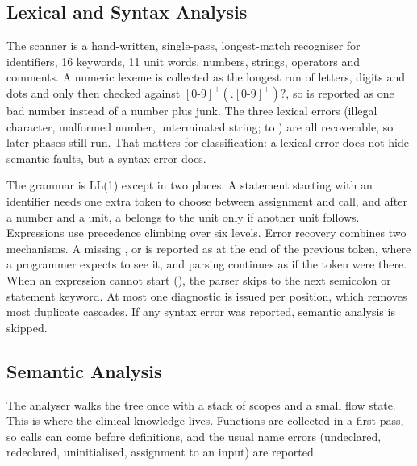 \subsection{Lexical and Syntax Analysis}

The scanner is a hand-written, single-pass, longest-match recogniser for identifiers, 16 keywords, 11 unit words,
numbers, strings, operators and \code{//} comments. A numeric lexeme is collected as the longest run of letters, digits
and dots and only then checked against $[0\text{-}9]^+(.[0\text{-}9]^+)?$, so  is reported as one bad
number instead of a number plus junk. The three lexical errors (illegal character, malformed number, unterminated
string;  to ) are all recoverable, so later phases still run. That matters for
classification: a lexical error does not hide semantic faults, but a syntax error does.

The grammar is LL(1) except in two places. A statement starting with an identifier needs one extra token to choose
between assignment and call, and after a number and a unit, a \code{/} belongs to the unit only if another unit follows.
Expressions use precedence climbing over six levels. Error recovery combines two mechanisms. A missing \code{;},
\code{)} or \code{\}} is reported as  at the end of the previous token, where a programmer expects to see
it, and parsing continues as if the token were there. When an expression cannot start (), the parser skips
to the next semicolon or statement keyword. At most one diagnostic is issued per position, which removes most duplicate
cascades. If any syntax error was reported, semantic analysis is skipped.

\subsection{Semantic Analysis}

The analyser walks the tree once with a stack of scopes and a small flow state. This is where the clinical knowledge
lives. Functions are collected in a first pass, so calls can come before definitions, and the usual name errors
(undeclared, redeclared, uninitialised, assignment to an input) are reported.

